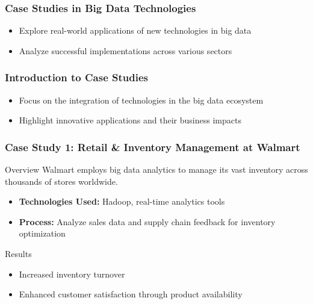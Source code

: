 \documentclass[aspectratio=169]{beamer}
\begin{document}
\begin{frame}[fragile]
    \frametitle{Case Studies in Big Data Technologies}
    \begin{itemize}
        \item Explore real-world applications of new technologies in big data
        \item Analyze successful implementations across various sectors
    \end{itemize}
\end{frame}

\begin{frame}[fragile]
    \frametitle{Introduction to Case Studies}
    \begin{itemize}
        \item Focus on the integration of technologies in the big data ecosystem
        \item Highlight innovative applications and their business impacts
    \end{itemize}
\end{frame}

\begin{frame}[fragile]
    \frametitle{Case Study 1: Retail & Inventory Management at Walmart}
    \begin{block}{Overview}
        Walmart employs big data analytics to manage its vast inventory across thousands of stores worldwide.
    \end{block}
    \begin{itemize}
        \item \textbf{Technologies Used:} Hadoop, real-time analytics tools
        \item \textbf{Process:} Analyze sales data and supply chain feedback for inventory optimization
    \end{itemize}
    \begin{block}{Results}
        \begin{itemize}
            \item Increased inventory turnover
            \item Enhanced customer satisfaction through product availability
        \end{itemize}
    \end{block}
\end{frame}
\end{document}
